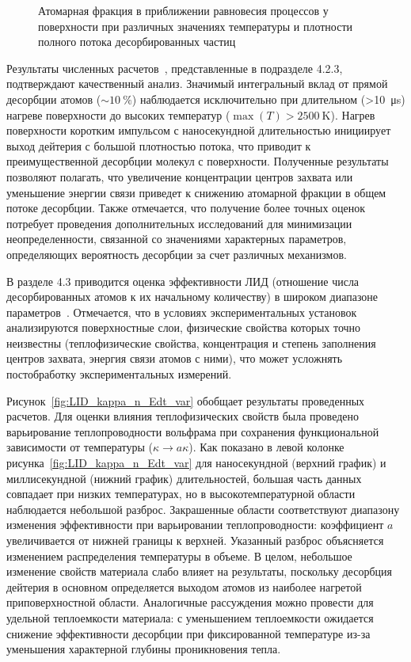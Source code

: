 \begin{figure}[ht]
    \caption{Атомарная фракция в приближении равновесия процессов у поверхности при различных значениях температуры и плотности полного потока десорбированных частиц}\label{fig:atomic_fraction_diagram}
\end{figure}

Результаты численных расчетов~\cite{Kulagin2022b}, представленные в подразделе 4.2.3, подтверждают качественный анализ. Значимый интегральный вклад от прямой десорбции атомов ($\sim\SI{10}{\percent}$) наблюдается исключительно при длительном (>\SI{10}{\micro\second}) нагреве поверхности до высоких температур ($\max(T)>\SI{2500}{\kelvin}$). Нагрев поверхности коротким импульсом с наносекундной длительностью инициирует выход дейтерия с большой плотностью потока, что приводит к преимущественной десорбции молекул с поверхности. Полученные результаты позволяют полагать, что увеличение концентрации центров захвата или уменьшение энергии связи приведет к снижению атомарной фракции в общем потоке десорбции. Также отмечается, что получение более точных оценок потребует проведения дополнительных исследований для минимизации неопределенности, связанной со значениями характерных параметров, определяющих вероятность десорбции за счет различных механизмов.

В разделе 4.3 приводится оценка эффективности ЛИД (отношение числа десорбированных атомов к их начальному количеству) в широком диапазоне параметров~\cite{Kulagin2023}. Отмечается, что в условиях экспериментальных установок анализируются поверхностные слои, физические свойства которых точно неизвестны (теплофизические свойства, концентрация и степень заполнения центров захвата, энергия связи атомов с ними), что может усложнять постобработку экспериментальных измерений. 

Рисунок~\cref{fig:LID_kappa_n_Edt_var} обобщает результаты проведенных расчетов. Для оценки влияния теплофизических свойств была проведено варьирование теплопроводности вольфрама при сохранения функциональной зависимости от температуры (\( \kappa \rightarrow a\kappa \)). Как показано в левой колонке рисунка~\cref{fig:LID_kappa_n_Edt_var} для наносекундной (верхний график) и миллисекундной (нижний график) длительностей, большая часть данных совпадает при низких температурах, но в высокотемпературной области наблюдается небольшой разброс. Закрашенные области соответствуют диапазону изменения эффективности при варьировании теплопроводности: коэффициент \(a\) увеличивается от нижней границы к верхней. Указанный разброс объясняется изменением распределения температуры в объеме. В целом, небольшое изменение свойств материала слабо влияет на результаты, поскольку десорбция дейтерия в основном определяется выходом атомов из наиболее нагретой приповерхностной области. Аналогичные рассуждения можно провести для удельной теплоемкости материала: с уменьшением теплоемкости ожидается снижение эффективности десорбции при фиксированной температуре из-за уменьшения характерной глубины проникновения тепла.

